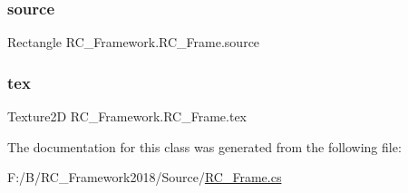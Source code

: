 \subsubsection{\texorpdfstring{source}{source}}
{\footnotesize\ttfamily Rectangle R\+C\+\_\+\+Framework.\+R\+C\+\_\+\+Frame.\+source}

\mbox{\label{class_r_c___framework_1_1_r_c___frame_a1cf940e9c27e48778d926c5cecea5544}} 
\subsubsection{\texorpdfstring{tex}{tex}}
{\footnotesize\ttfamily Texture2D R\+C\+\_\+\+Framework.\+R\+C\+\_\+\+Frame.\+tex}



The documentation for this class was generated from the following file\+:\begin{DoxyCompactItemize}
\item 
F\+:/\+B/\+R\+C\+\_\+\+Framework2018/\+Source/\mbox{\hyperlink{_r_c___frame_8cs}{R\+C\+\_\+\+Frame.\+cs}}\end{DoxyCompactItemize}
